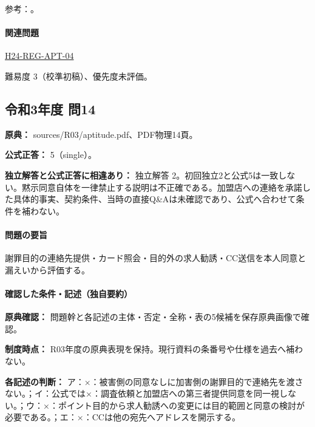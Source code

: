 \par 参考：\cite{privacy_general,privacy_evacuation2013,privacy_evacuation_scope}。

\paragraph{関連問題} \hyperref[q:h24-reg-apt-04]{H24-REG-APT-04}

\par 難易度 3（校準初稿）、優先度未評価。

\subsection{令和3年度 問14}
\label{q:r03-reg-apt-14}

\noindent\textbf{原典：} sources/R03/aptitude.pdf、PDF物理14頁。

\textbf{公式正答：} 5（single）。

\par\textbf{独立解答と公式正答に相違あり：} 独立解答 2。初回独立2と公式5は一致しない。黙示同意自体を一律禁止する説明は不正確である。加盟店への連絡を承諾した具体的事実、契約条件、当時の直接Q\&Aは未確認であり、公式へ合わせて条件を補わない。

\paragraph{問題の要旨} 謝罪目的の連絡先提供・カード照会・目的外の求人勧誘・CC送信を本人同意と漏えいから評価する。

\paragraph{確認した条件・記述（独自要約）}\mbox{}\par

\noindent\textbf{原典確認：} 問題幹と各記述の主体・否定・全称・表の5候補を保存原典画像で確認。\par

\noindent\textbf{制度時点：} R03年度の原典表現を保持。現行資料の条番号や仕様を過去へ補わない。\par

\noindent\textbf{各記述の判断：} ア：×：被害側の同意なしに加害側の謝罪目的で連絡先を渡さない。；イ：公式では×：調査依頼と加盟店への第三者提供同意を同一視しない。；ウ：×：ポイント目的から求人勧誘への変更には目的範囲と同意の検討が必要である。；エ：×：CCは他の宛先へアドレスを開示する。\par

